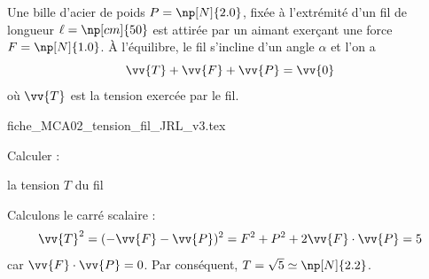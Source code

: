                                \initialisationPartieGauche %
Une bille d'acier de poids $P=\np[N]{2.0}$, fixée à l'extrémité d'un fil de longueur $\ell=\np[cm]{50}$ est attirée par un aimant exerçant une force $F=\np[N]{1.0}$. À l'équilibre, le fil s'incline d'un angle $\alpha$ et l'on a 
\[
	\vv{T}+\vv{F}+\vv{P}=\vv{0}
\]
où $\vv{T}$ est la tension exercée par le fil. 
                                \initialisationPartieDroite %
\begin{center}
{fiche_MCA02_tension_fil_JRL_v3.tex}
\end{center}
                               \finalisationDuPartageDePage %

Calculer :



\debutEntrainement

\begin{enonce}
la tension $T$ du fil	 
\end{enonce}


\begin{corrige}
	Calculons le carré scalaire : 
	\[
	\vv{T}^2=(-\vv{F}-\vv{P})^2=
	F^2+P^2+2 \vv{F}\cdot \vv{P}=5
	\]
	car $\vv{F}\cdot \vv{P} = 0$.
	Par conséquent, $T=\sqrt{5}\simeq \np[N]{2.2}$. 
\end{corrige}

